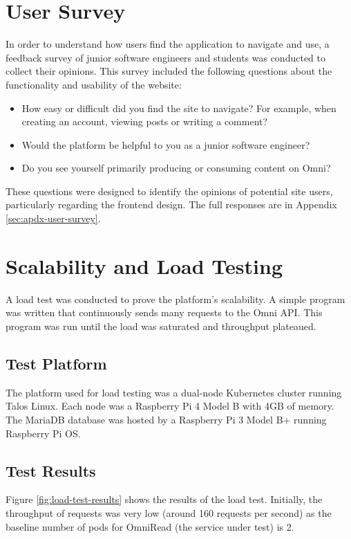 \section{User Survey}
In order to understand how users find the application to navigate and use, a feedback survey of junior software engineers and students was conducted to collect their opinions.
This survey included the following questions about the functionality and usability of the website:
\begin{itemize}
    \item How easy or difficult did you find the site to navigate? For example, when creating an account, viewing posts or writing a comment?
    \item Would the platform be helpful to you as a junior software engineer?
    \item Do you see yourself primarily producing or consuming content on Omni?
\end{itemize}
These questions were designed to identify the opinions of potential site users, particularly regarding the frontend design.
The full responses are in Appendix \ref{sec:apdx-user-survey}.

\section{Scalability and Load Testing}
A load test was conducted to prove the platform's scalability. A simple program was written that continuously sends many requests to the Omni API.
This program was run until the load was saturated and throughput plateaued. 

\subsection{Test Platform}
The platform used for load testing was a dual-node Kubernetes cluster running Talos Linux.
Each node was a Raspberry Pi 4 Model B with 4GB of memory. The MariaDB database was hosted by a Raspberry Pi 3 Model B+ running Raspberry Pi OS.

\subsection{Test Results}
Figure \ref{fig:load-test-results} shows the results of the load test. Initially, the throughput of requests was very low (around 160 requests per second) as the baseline number of pods for OmniRead (the service under test) is 2.

